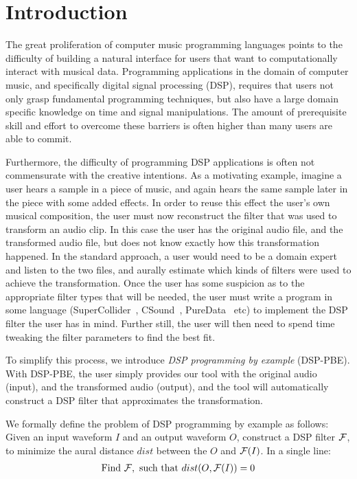 \section{Introduction}

The great proliferation of computer music programming languages points to the difficulty of building a natural interface for users that want to computationally interact with musical data.
Programming applications in the domain of computer music, and specifically digital signal processing (DSP), requires that users not only grasp fundamental programming techniques, but also have a large domain specific knowledge on time and signal manipulations.
The amount of prerequisite skill and effort to overcome these barriers is often higher than many users are able to commit.

Furthermore, the difficulty of programming DSP applications is often not commensurate with the creative intentions. 
As a motivating example, imagine a user hears a sample in a piece of music, and again hears the same sample later in the piece with some added effects.
In order to reuse this effect the user's own musical composition, the user must now reconstruct the filter that was used to transform an audio clip. 
In this case the user has the original audio file, and the transformed audio file, but does not know exactly how this transformation happened.
In the standard approach, a user would need to be a domain expert and listen to the two files, and aurally estimate which kinds of filters were used to achieve the transformation. 
Once the user has some suspicion as to the appropriate filter types that will be needed, the user must write a program in some language (SuperCollider~\cite{supercollider}, CSound~\cite{csound}, PureData~\cite{puredata} etc) to implement the DSP filter the user has in mind. 
Further still, the user will then need to spend time tweaking the filter parameters to find the best fit. 


To simplify this process, we introduce \textit{DSP programming by example} (DSP-PBE). 
With DSP-PBE, the user simply provides our tool with the original audio (input), and the transformed audio (output), and the tool will automatically construct a DSP filter that approximates the transformation.

We formally define the problem of DSP programming by example as follows:
Given an input waveform $I$ and an output waveform $O$, construct a DSP filter $\mathcal{F}$, to minimize the aural distance $dist$ between the $O$ and $\mathcal{F}(I)$.
In a single line:
%
\begin{align*}
\text{Find } \mathcal{F}, \text{ such that } dist(O,\mathcal{F}(I))=0
\end{align*}


